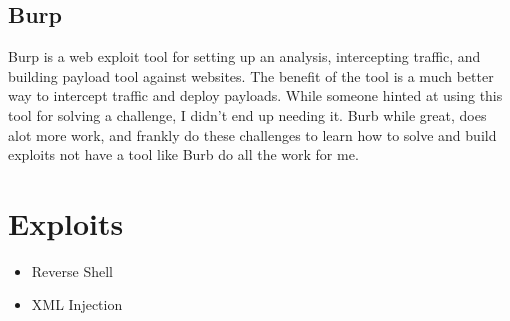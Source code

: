 \documentclass{article}
\begin{document}
\subsection{Burp}

Burp is a web exploit tool for setting up an analysis, intercepting traffic, and building payload tool against websites. The benefit of the tool is a much better way to intercept traffic and deploy payloads.  While someone hinted at using this tool for solving a challenge, I didn't end up needing it.  Burb while great, does alot more work, and frankly do these challenges to learn how to solve and build exploits not have a tool like Burb do all the work for me.

\section{Exploits}

\begin{itemize}
    \item Reverse Shell
    \item XML Injection
\end{itemize}


\end{document}
